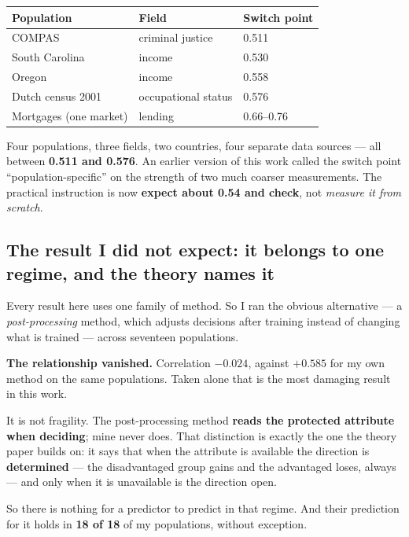 \documentclass[11pt,a4paper]{article}
\begin{document}
\begin{center}
\small
\begin{tabularx}{\linewidth}{Xll}
\toprule
\textbf{Population} & \textbf{Field} & \textbf{Switch point} \\
\midrule
COMPAS & criminal justice & 0.511 \\
South Carolina & income & 0.530 \\
Oregon & income & 0.558 \\
Dutch census 2001 & occupational status & 0.576 \\
\midrule
Mortgages (one market) & lending & 0.66--0.76 \\
\bottomrule
\end{tabularx}
\end{center}

Four populations, three fields, two countries, four separate data sources --- all between
\textbf{0.511 and 0.576}. An earlier version of this work called the switch point
``population-specific'' on the strength of two much coarser measurements. The practical
instruction is now \textbf{expect about 0.54 and check}, not \emph{measure it from scratch}.

\subsection{The result I did not expect: it belongs to one regime, and the theory names it}

Every result here uses one family of method. So I ran the obvious alternative --- a
\emph{post-processing} method, which adjusts decisions after training instead of changing what
is trained --- across seventeen populations.

\textbf{The relationship vanished.} Correlation $-0.024$, against $+0.585$ for my own method on
the same populations. Taken alone that is the most damaging result in this work.

It is not fragility. The post-processing method \textbf{reads the protected attribute when
deciding}; mine never does. That distinction is exactly the one the theory paper builds on: it
says that when the attribute is available the direction is \textbf{determined} --- the
disadvantaged group gains and the advantaged loses, always --- and only when it is unavailable
is the direction open.

So there is nothing for a predictor to predict in that regime. And their prediction for it
holds in \textbf{18 of 18} of my populations, without exception.
\end{document}
